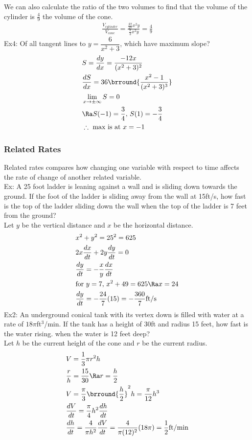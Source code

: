 We can also calculate the ratio of the two volumes to find that the volume of the cylinder is $\frac{4}{9}$ the volume of the cone.
\begin{align*}
    \frac{V_{cylinder}}{V_{cone}}=\frac{\frac{4\pi}{27}x^2y}{\frac{\pi}{3} x^2y}=\frac{4}{9}
\end{align*}
Ex4: Of all tangent lines to $y=\dfrac{6}{x^2+3}$, which have maximum slope?
\begin{align*}
    &S=\frac{dy}{dx}=\frac{-12x}{(x^2+3)^2}\\
    &\frac{dS}{dx}=36\brround{\frac{x^2-1}{(x^2+3)^3}}\\
    &\lim_{x\to\pm\infty}S=0\\
    &\Ra S(-1)=\frac{3}{4},\, S(1)=-\frac{3}{4}\\
    &\therefore\text{ max is at }x=-1
\end{align*}

\subsubsection{Related Rates}
Related rates compares how changing one variable with respect to time affects the rate of change of another related variable.\\
Ex: A 25 foot ladder is leaning against a wall and is sliding down towards the ground. If the foot of the ladder is sliding away from the wall at 15ft/s, how fast is the top of the ladder sliding down the wall when the top of the ladder is 7 feet from the ground?\\
Let $y$ be the vertical distance and $x$ be the horizontal distance.\\
\begin{align*}
    &x^2+y^2=25^2=625\\
    &2x\frac{dx}{dt}+2y\frac{dy}{dt}=0\\
    &\frac{dy}{dt}=-\frac{x}{y}\frac{dx}{dt}\\
    &\text{for $y=7$, }x^2+49=625\Ra x=24\\
    &\frac{dy}{dt}=-\frac{24}{7}(15)=-\frac{360}{7}\mathrm{ft/s}
\end{align*}
Ex2: An underground conical tank with its vertex down is filled with water at a rate of $18\pi$ft$^3$/min. If the tank has a height of 30ft and radius 15 feet, how fast is the water rising. when the water is 12 feet deep?\\
Let $h$ be the current height of the cone and $r$ be the current radius.
\begin{align*}
    &V=\frac{1}{3}\pi r^2h\\
    &\frac{r}{h}=\frac{15}{30}\Ra r=\frac{h}{2}\\
    &V=\frac{\pi}{3}\brround{\frac{h}{2}}^2h=\frac{\pi}{12}h^3\\
    &\frac{dV}{dt}=\frac{\pi}{4}h^2\frac{dh}{dt}\\
    &\frac{dh}{dt}=\frac{4}{\pi h^2}\frac{dV}{dt}=\frac{4}{\pi(12)^2}(18\pi)=\frac{1}{2}\mathrm{ft/min}
\end{align*}